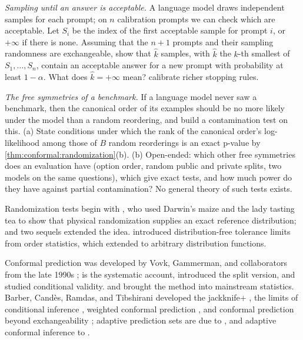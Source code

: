 \begin{refsection}
\begin{exercises}
\item \transfer \emph{Sampling until an answer is acceptable.} A language model draws independent samples for each prompt; on $n$ calibration prompts we can check which are acceptable. Let $S_i$ be the index of the first acceptable sample for prompt $i$, or $+\infty$ if there is none. Assuming that the $n+1$ prompts and their sampling randomness are exchangeable, show that $\widehat k$ samples, with $\widehat k$ the $k$-th smallest of $S_1,\dots,S_n$, contain an acceptable answer for a new prompt with probability at least $1-\alpha$. What does $\widehat k=+\infty$ mean? \textcite{Quach2024} calibrate richer stopping rules.\label{ex:conformal:llm}

\item \research\harder \emph{The free symmetries of a benchmark.} If a language model never saw a benchmark, then the canonical order of its examples should be no more likely under the model than a random reordering, and \textcite{Oren2024} build a contamination test on this. (a) State conditions under which the rank of the canonical order's log-likelihood among those of $B$ random reorderings is an exact p-value by \cref{thm:conformal:randomization}(b). (b) Open-ended: which other free symmetries does an evaluation have (option order, random public and private splits, two models on the same questions), which give exact tests, and how much power do they have against partial contamination? No general theory of such tests exists. \label{ex:conformal:benchmark}
\end{exercises}

\notesandrefs

Randomization tests begin with \textcite{Fisher1935}, who used Darwin's maize and the lady tasting tea to show that physical randomization supplies an exact reference distribution; \textcite{Pitman1937} and two sequels extended the idea. \textcite{Wilks1941} introduced distribution-free tolerance limits from order statistics, which \textcite{ScheffeTukey1945} extended to arbitrary distribution functions.

Conformal prediction was developed by Vovk, Gammerman, and collaborators from the late 1990s \parencite{Gammerman1998}; \textcite{Vovk2005} is the systematic account, \textcite{Papadopoulos2002} introduced the split version, and \textcite{Vovk2012} studied conditional validity. \textcite{LeiWasserman2014} and \textcite{Lei2018} brought the method into mainstream statistics. Barber, Cand\`es, Ramdas, and Tibshirani developed the jackknife+ \parencite{Barber2021a}, the limits of conditional inference \parencite{Barber2021b}, weighted conformal prediction \parencite{Tibshirani2019}, and conformal prediction beyond exchangeability \parencite{Barber2023}; adaptive prediction sets are due to \textcite{Romano2020}, and adaptive conformal inference to \textcite{GibbsCandes2021}.


\end{refsection}

